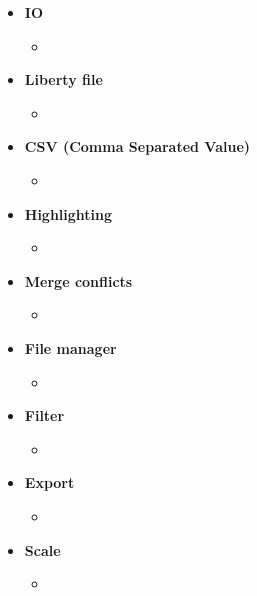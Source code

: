 \documentclass[10pt,a4paper]{report}
\newcommand{\itemglo}[3]{
    \label{glo:#1}\textbf{#2}
    \begin{itemize}[noitemsep, topsep=0pt, label=]
        \item #3
    \end{itemize}
}
\newcommand{\refer}[2]{\hyperref[#1]{\textcolor{col:reference}{#2}}}
\newcommand{\refg}[2]{\refer{glo:#1}{#2}}
\begin{document}
\begin{itemize}[label=]
    \item \itemglo{io}{IO}{}
    \item \itemglo{liberty_file}{Liberty file}{}
    \item \itemglo{csv}{CSV (Comma Separated Value)}{}
    \item \itemglo{highlighting}{Highlighting}{}
    \item \itemglo{merge_conflicts}{Merge conflicts}{}
    \item \itemglo{file_manager}{File manager}{}
    \item \itemglo{filter}{Filter}{}
    \item \itemglo{export}{Export}{}
    \item \itemglo{scale}{Scale}{}
\end{itemize}

\end{document}
